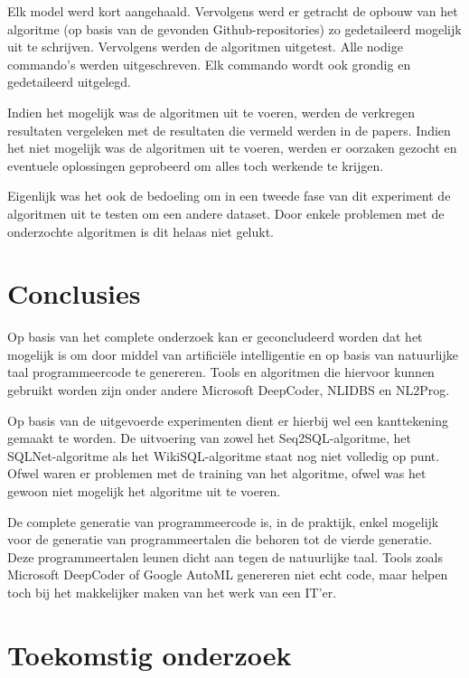 \documentclass[a0,portrait]{a0poster}
\begin{document}
\begin{multicols}{2}
Elk model werd kort aangehaald. Vervolgens werd er getracht de opbouw van het algoritme (op basis van de gevonden Github-repositories) zo gedetaileerd mogelijk uit te schrijven. Vervolgens werden de algoritmen uitgetest. Alle nodige commando's werden uitgeschreven. Elk commando wordt ook grondig en gedetaileerd uitgelegd.

Indien het mogelijk was de algoritmen uit te voeren, werden de verkregen resultaten vergeleken met de resultaten die vermeld werden in de papers. Indien het niet mogelijk was de algoritmen uit te voeren, werden er oorzaken gezocht en eventuele oplossingen geprobeerd om alles toch werkende te krijgen. 

Eigenlijk was het ook de bedoeling om in een tweede fase van dit experiment de algoritmen uit te testen om een andere dataset. Door enkele problemen met de onderzochte algoritmen is dit helaas niet gelukt.


\color{HoGentAccent1} 
\section*{Conclusies}
\color{black}
Op basis van het complete onderzoek kan er geconcludeerd worden dat het mogelijk is om door middel van artifici\"ele intelligentie en op basis van natuurlijke taal programmeercode te genereren. Tools en algoritmen die hiervoor kunnen gebruikt worden zijn onder andere Microsoft DeepCoder, NLIDBS en NL2Prog.

Op basis van de uitgevoerde experimenten dient er hierbij wel een kanttekening gemaakt te worden. De uitvoering van zowel het Seq2SQL-algoritme, het SQLNet-algoritme als het WikiSQL-algoritme staat nog niet volledig op punt. Ofwel waren er problemen met de training van het algoritme, ofwel was het gewoon niet mogelijk het algoritme uit te voeren. 

De complete generatie van programmeercode is, in de praktijk, enkel mogelijk voor de generatie van programmeertalen die behoren tot de vierde generatie. Deze programmeertalen leunen dicht aan tegen de natuurlijke taal. Tools zoals Microsoft DeepCoder of Google AutoML genereren niet echt code, maar helpen toch bij het makkelijker maken van het werk van een IT'er.
\color{HoGentAccent1} 
\section*{Toekomstig onderzoek}
\color{black}


\end{multicols}
\end{document}
